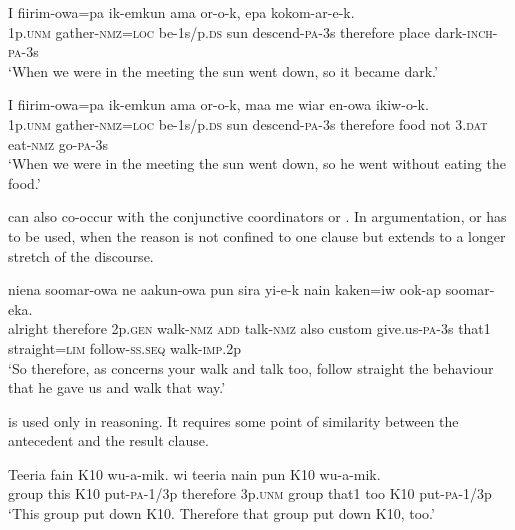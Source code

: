 \ea%
\label{ex:x1414}
\gll I fiirim-owa=pa ik-emkun ama or-o-k,  epa kokom-ar-e-k.\\
1p.\textsc{unm} gather-\textsc{nmz}=\textsc{loc} be-1s/p.\textsc{ds} sun descend-\textsc{pa}-3s therefore place dark-\textsc{inch}-\textsc{pa}-3s\\
\glt`When we were in the meeting the sun went down, so it became dark.'
\z

\ea%
\label{ex:x1415}
\gll I fiirim-owa=pa ik-emkun ama or-o-k,  maa me wiar en-owa ikiw-o-k.\\
1p.\textsc{unm} gather-\textsc{nmz}=\textsc{loc} be-1s/p.\textsc{ds} sun descend-\textsc{pa}-3s therefore food not 3.\textsc{dat} eat-\textsc{nmz} go-\textsc{pa}-3s\\
\glt`When we were in the meeting the sun went down, so he went without eating the food.'
\z

 can also co-occur with the conjunctive coordinators  or . In argumentation,  or  has to be used, when the reason is not confined to one clause but extends to a longer stretch of the discourse.

\ea%
\label{ex:x1406}
\gll {}  niena soomar-owa ne aakun-owa pun sira yi-e-k nain kaken=iw ook-ap soomar-eka.\\
alright therefore 2p.\textsc{gen} walk-\textsc{nmz} \textsc{add} talk-\textsc{nmz} also custom give.us-\textsc{pa}-3s that1 straight=\textsc{lim} follow-\textsc{ss}.\textsc{seq} walk-\textsc{imp}.2p\\
\glt`So therefore, as concerns your walk and talk too, follow straight the behaviour that he gave us and walk that way.'
\z

 is used only in reasoning. It requires some point of similarity between the antecedent and the result clause.

\ea%
\label{ex:x736}
\gll Teeria fain K10 wu-a-mik.  wi teeria nain pun K10 wu-a-mik.\\
group this K10 put-\textsc{pa}-1/3p therefore 3p.\textsc{unm} group that1 too K10 put-\textsc{pa}-1/3p\\
\glt`This group put down K10. Therefore that group put down K10, too.'
\z

